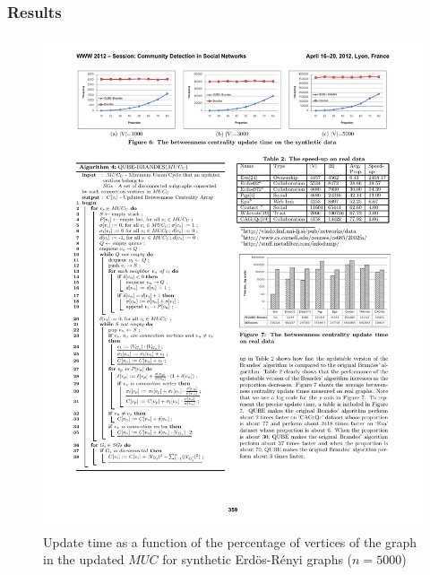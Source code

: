 \begin{frame}
  \frametitle{Results}

  \begin{figure}[t]
    \centering
    \includegraphics[width=\textwidth, height=0.7\textheight, keepaspectratio]{imgs/qube-results1}
    \caption{Update time as a function of the percentage of vertices of the graph in the updated $MUC$ for synthetic Erd\"{o}s-R\'{e}nyi graphs ($n = 5000$)}
  \end{figure}
    
\end{frame}


